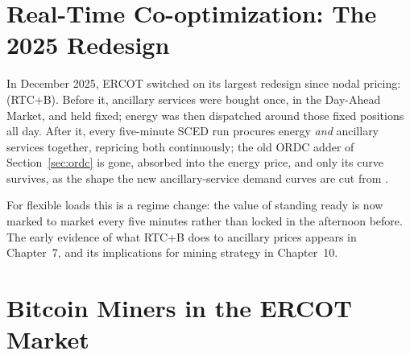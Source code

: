 \section{Real-Time Co-optimization: The 2025 Redesign}
\label{sec:rtcb}

In December 2025, ERCOT switched on its largest redesign since nodal pricing:  (RTC+B). Before it, ancillary services were bought once, in the Day-Ahead Market, and held fixed; energy was then dispatched around those fixed positions all day. After it, every five-minute SCED run procures energy \emph{and} ancillary services together, repricing both continuously; the old ORDC adder of Section~\ref{sec:ordc} is gone, absorbed into the energy price, and only its curve survives, as the shape the new ancillary-service demand curves are cut from \autocite{ercot2025rtcblive,potomac2026somercot}. %

For flexible loads this is a regime change: the value of standing ready is now marked to market every five minutes rather than locked in the afternoon before. The early evidence of what RTC+B does to ancillary prices appears in Chapter~7, and its implications for mining strategy in Chapter~10.

\section{Bitcoin Miners in the ERCOT Market}
\label{sec:miners-ercot}

